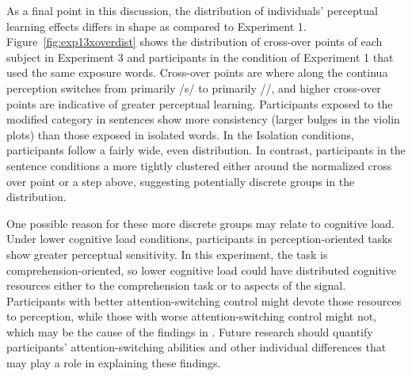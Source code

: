As a final point in this discussion, the distribution of individuals' perceptual learning effects differs in shape as compared to Experiment 1. 
Figure~\ref{fig:exp13xoverdist} shows the distribution of cross-over points of each subject in Experiment 3 and participants in the condition of Experiment 1 that used the same exposure words.  
Cross-over points are where along the continua perception switches from primarily /s/ to primarily /\textesh/, and higher cross-over points are indicative of greater perceptual learning.
Participants exposed to the modified category in sentences show more consistency (larger bulges in the violin plots) than those exposed in isolated words.
In the Isolation conditions, participants follow a fairly wide, even distribution.
In contrast, participants in the sentence conditions a more tightly clustered either around the normalized cross over point or a step above, suggesting potentially discrete groups in the distribution.

One possible reason for these more discrete groups may relate to cognitive load.
Under lower cognitive load conditions, participants in perception-oriented tasks show greater perceptual sensitivity.
In this experiment, the task is comprehension-oriented, so lower cognitive load could have distributed cognitive resources either to the comprehension task or to aspects of the signal.
Participants with better attention-switching control might devote those resources to perception, while those with worse attention-switching control might not, which may be the cause of the findings in \citet{Scharenborg2013}.
Future research should quantify participants' attention-switching abilities and other individual differences that may play a role in explaining these findings.



